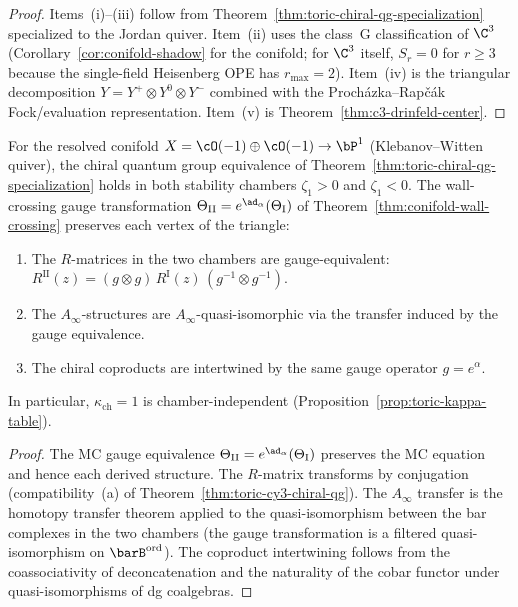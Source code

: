 \begin{proof}
Items~(i)--(iii) follow from
Theorem~\ref{thm:toric-chiral-qg-specialization} specialized
to the Jordan quiver. Item~(ii) uses the class~G classification
of $\C^3$ (Corollary~\ref{cor:conifold-shadow} for the conifold;
for $\C^3$ itself, $S_r = 0$ for $r \geq 3$ because the single-field
Heisenberg OPE has $r_{\max} = 2$). Item~(iv) is the triangular
decomposition $Y = Y^+ \otimes Y^0 \otimes Y^-$ combined with the
Proch\'azka--Rap\v{c}\'ak Fock/evaluation representation. Item~(v) is
Theorem~\ref{thm:c3-drinfeld-center}.
\end{proof}

\begin{corollary}
\label{cor:conifold-chiral-qg}
For the resolved conifold $X = \cO(-1) \oplus \cO(-1) \to \bP^1$
\textup{(}Klebanov--Witten quiver\textup{)}, the chiral quantum
group equivalence of
Theorem~\textup{\ref{thm:toric-chiral-qg-specialization}} holds
in both stability chambers $\zeta_1 > 0$ and $\zeta_1 < 0$. The
wall-crossing gauge transformation
$\Theta_{\mathrm{II}} = e^{\ad_\alpha}(\Theta_{\mathrm{I}})$
of Theorem~\textup{\ref{thm:conifold-wall-crossing}}
preserves each vertex of the triangle:
\begin{enumerate}[label=\textup{(\roman*)}]
 \item The $R$-matrices in the two chambers are gauge-equivalent:
 $R^{\mathrm{II}}(z) = (g \otimes g)\, R^{\mathrm{I}}(z)\,
 (g^{-1} \otimes g^{-1})$.
 \item The $A_\infty$-structures are $A_\infty$-quasi-isomorphic
 via the transfer induced by the gauge equivalence.
 \item The chiral coproducts are intertwined by the same
 gauge operator $g = e^\alpha$.
\end{enumerate}
In particular, $\kappa_{\mathrm{ch}} = 1$ is chamber-independent
\textup{(}Proposition~\textup{\ref{prop:toric-kappa-table}}\textup{)}.
\end{corollary}

\begin{proof}
The MC gauge equivalence
$\Theta_{\mathrm{II}} = e^{\ad_\alpha}(\Theta_{\mathrm{I}})$
preserves the MC equation and hence each derived structure.
The $R$-matrix transforms by conjugation (compatibility~(a)
of Theorem~\ref{thm:toric-cy3-chiral-qg}). The $A_\infty$
transfer is the homotopy transfer theorem applied to the
quasi-isomorphism between the bar complexes in the two
chambers (the gauge transformation is a filtered
quasi-isomorphism on $\barB^{\mathrm{ord}}$). The coproduct
intertwining follows from the coassociativity of
deconcatenation and the naturality of the cobar functor
under quasi-isomorphisms of dg coalgebras.
\end{proof}


